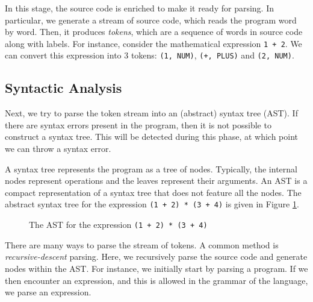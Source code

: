 In this stage, the source code is enriched to make it ready for parsing. In particular, we generate a stream of source code, which reads the program word by word. Then, it produces \emph{tokens}, which are a sequence of words in source code along with labels. For instance, consider the mathematical expression \texttt{1 + 2}. We can convert this expression into 3 tokens: \texttt{(1, NUM)}, \texttt{(+, PLUS)} and \texttt{(2, NUM)}. 

\subsection{Syntactic Analysis}
Next, we try to parse the token stream into an (abstract) syntax tree (AST). If there are syntax errors present in the program, then it is not possible to construct a syntax tree. This will be detected during this phase, at which point we can throw a syntax error.

A syntax tree represents the program as a tree of nodes. Typically, the internal nodes represent operations and the leaves represent their arguments. An AST is a compact representation of a syntax tree that does not feature all the nodes. The abstract syntax tree for the expression \texttt{(1 + 2) * (3 + 4)} is given in Figure \ref{fig:AST_example}.

\begin{figure}[htb]
    \centering
    \caption{The AST for the expression \texttt{(1 + 2) * (3 + 4)}}
    \label{fig:AST_example}
\end{figure}

There are many ways to parse the stream of tokens. A common method is \emph{recursive-descent} parsing. Here, we recursively parse the source code and generate nodes within the AST. For instance, we initially start by parsing a program. If we then encounter an expression, and this is allowed in the grammar of the language, we parse an expression.

